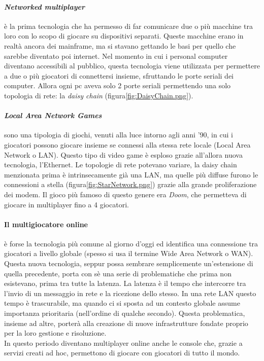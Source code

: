         \paragraph{\textit{Networked multiplayer}} è la prima tecnologia che ha permesso di far comunicare due o più macchine tra loro con lo scopo di giocare su dispositivi separati. 
            Queste macchine erano in realtà ancora dei mainframe, ma si stavano gettando le basi per quello che sarebbe diventato poi internet. Nel momento in cui i personal computer
            diventano accessibili al pubblico, questa tecnologia viene utilizzata per permettere a due o più giocatori di connettersi insieme, sfruttando le porte seriali dei computer. 
            Allora ogni pc aveva solo 2 porte seriali permettendo una solo topologia di rete: la \textit{daisy chain} (figura\ref{fig:DaisyChain.png}).
 
        \paragraph{\textit{Local Area Network Games}} sono una tipologia di giochi, venuti alla luce intorno agli anni '90, in cui i giocatori possono giocare insieme se connessi alla stessa
            rete locale (Local Area Network o LAN). Questo tipo di video game è esploso grazie all'allora nuova tecnologia, l'Ethernet. Le topologie di rete potevano variare,
            la daisy chain menzionata prima è intrinsecamente già una LAN, ma quelle più diffuse furono le connessioni a stella (figura\ref{fig:StarNetwork.png}) grazie alla grande 
            proliferazione dei modem. Il gioco più famoso di questo genere era \textit{Doom}, che permetteva di giocare in multiplayer fino a 4 giocatori.

        \paragraph{Il multigiocatore online} è forse la tecnologia più comune al giorno d'oggi ed identifica una connessione tra giocatori a livello globale (spesso si usa il termine
            Wide Area Network o WAN). Questa nuova tecnologia, seppur possa sembrare semplicemente un'estensione di quella precedente, porta con sè una serie di problematiche
            che prima non esistevano, prima tra tutte la latenza. La latenza è il tempo che intercorre tra l'invio di un messaggio in rete e la ricezione dello stesso. In una rete
            LAN questo tempo è trascurabile, ma quando ci si sposta ad un contesto globale assume importanza prioritaria (nell'ordine di qualche secondo). Questa problematica, insieme
            ad altre, porterà alla creazione di nuove infrastrutture fondate proprio per la loro gestione e risoluzione.\\
            In questo periodo diventano multiplayer online anche le console che, grazie a servizi creati ad hoc, permettono di giocare con giocatori di tutto il mondo. 
        
